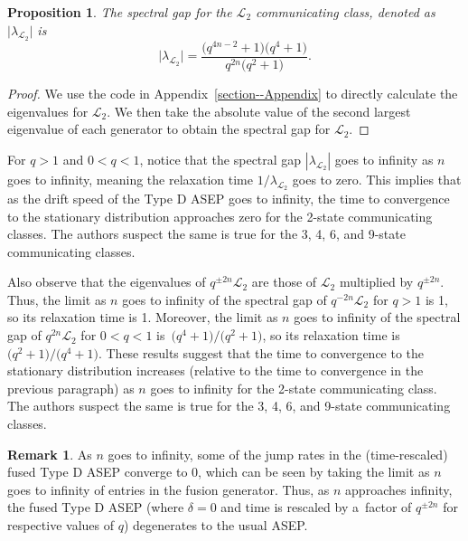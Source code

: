 \documentclass[pdftex]{sigma}
\numberwithin{equation}{section}
\newtheorem{Proposition}[Theorem]{Proposition}
\theoremstyle{definition}
\newtheorem{Remark}[Theorem]{Remark}
\begin{document}
\begin{Proposition}
 \label{SpectralStatement}
 The spectral gap for the $\mathcal{L}_2$ communicating class, denoted as $\lvert \lambda_{\mathcal{L}_2} \rvert$ is
 \[\lvert \lambda_{\mathcal{L}_2} \rvert = \frac{\bigl(q^{4n-2}+1\bigr)\bigl(q^4+1\bigr)}{q^{2n}\bigl(q^2+1\bigr)}.\]
\end{Proposition}
\begin{proof}
\label{SpectralStatement_proof}
We use the code in Appendix~\ref{section--Appendix} to directly calculate the eigenvalues for $\mathcal{L}_2$. We then take the absolute value of the second largest eigenvalue of each generator to obtain the spectral gap for $\mathcal{L}_2$.
\end{proof}

For $q > 1$ and $0 < q < 1$, notice that the spectral gap $|\lambda_{\mathcal{L}_2}|$ goes to infinity as $n$ goes to infinity, meaning the relaxation time $1/\lambda_{\mathcal{L}_2}$ goes to zero. This implies that as the drift speed of the Type D ASEP goes to infinity, the time to convergence to the stationary distribution approaches zero for the 2-state communicating classes. The authors suspect the same is true for the 3, 4, 6, and 9-state communicating classes.

Also observe that the eigenvalues of $q^{\pm 2n} \mathcal{L}_2$ are those of $\mathcal{L}_2$ multiplied by $q^{\pm 2n}$. Thus, the limit as $n$ goes to infinity of the spectral gap of $q^{-2n} \mathcal{L}_2$ for $q > 1$ is 1, so its relaxation time is 1. Moreover, the limit as $n$ goes to infinity of the spectral gap of $q^{2n} \mathcal{L}_2$ for $0 < q < 1$ is~${\bigl(q^4 + 1\bigr)/\bigl(q^2 + 1\bigr)}$, so its relaxation time is $\bigl(q^2 + 1\bigr)/\bigl(q^4 + 1\bigr)$. These results suggest that the time to convergence to the stationary distribution increases (relative to the time to convergence in the previous paragraph) as $n$ goes to infinity for the 2-state communicating class. The authors suspect the same is true for the 3, 4, 6, and 9-state communicating classes.

\begin{Remark}
As $n$ goes to infinity, some of the jump rates in the (time-rescaled) fused Type D ASEP converge to $0$, which can be seen by taking the limit as $n$ goes to infinity of entries in the fusion generator. Thus, as $n$ approaches infinity, the fused Type D ASEP (where $\delta = 0$ and time is rescaled by a~factor of $q^{\pm 2n}$ for respective values of $q$) degenerates to the usual ASEP.
\end{Remark}
\end{document}
